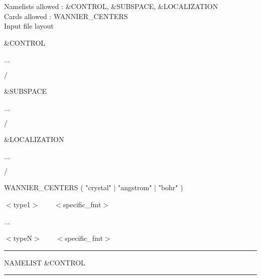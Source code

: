 \noindent Namelists allowed : \&CONTROL, \&SUBSPACE, \&LOCALIZATION\\
\noindent Cards allowed : WANNIER\_CENTERS\\
\noindent Input file layout
\begin{description}
  \item \&CONTROL
  \item ...
  \item $/$
  \item
  \item \&SUBSPACE
  \item ...
  \item $/$
  \item
  \item \&LOCALIZATION
  \item ...
  \item $/$
  \item
  \item WANNIER\_CENTERS ( "crystal" $\mid$ "angstrom" $\mid$ "bohr" )
  \item $<$type1$> \qquad    <$specific\_fmt$>$
  \item ...
  \item $<$typeN$> \qquad    <$specific\_fmt$>$
\end{description}

\begin{centering}
\rule{2.2in}{0.01in} NAMELIST \&CONTROL \rule{2.2in}{0.01in}
\end{centering}\\


